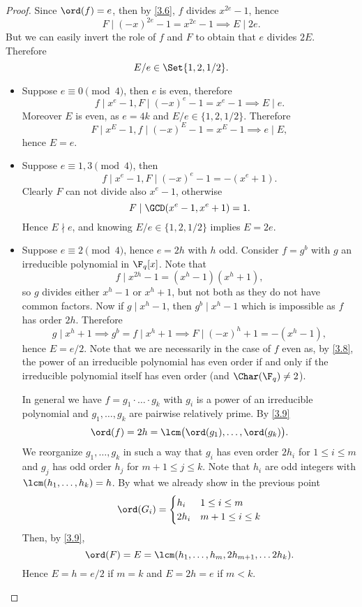 \begin{proof}
	Since \(\ord(f)=e\), then by \autoref{3.6}, \(f\) divides \(x^{2e}-1\), hence
	\[
		F \mid (-x)^{2e}-1 = x^{2e}-1 \implies E \mid 2e.
	\]
	But we can easily invert the role of \(f\) and \(F\) to obtain that \(e\) divides \(2E\). Therefore
	\[
		E/e \in \Set{1,2,1/2}.
	\]
	\begin{itemize}
		\item Suppose \(e \equiv 0 \pmod{4}\), then \(e\) is even, therefore
		      \[
			      f \mid x^e-1, F\mid (-x)^e-1 = x^e-1 \implies E \mid e.
		      \]
		      Moreover \(E\) is even, as \(e=4k\) and \(E/e \in \{1,2,1/2\}\). Therefore
		      \[
			      F \mid x^E-1, f \mid (-x)^E-1 = x^E-1 \implies e \mid E,
		      \]
		      hence \(E=e\).
		\item Suppose \(e \equiv 1,3 \pmod{4}\), then
		      \[
			      f \mid x^e-1, F \mid (-x)^e-1 = -(x^e+1).
		      \]
		      Clearly \(F\) can not divide also \(x^e-1\), otherwise
		      \[
			      F \mid \GCD(x^e-1,x^e+1) =1.
		      \]
		      Hence \(E \nmid e\), and knowing \(E/e \in \{1,2,1/2\}\) implies \(E=2e\).
		\item Suppose \(e \equiv 2 \pmod{4}\), hence \(e = 2h\) with \(h\) odd. Consider \(f=g^b\) with \(g\) an irreducible polynomial in \(\F_q[x]\). Note that
		      \[
			      f \mid x^{2h}-1 = (x^h-1)(x^h+1),
		      \]
		      so \(g\) divides either \(x^h-1\) or \(x^h+1\), but not both as they do not have common factors.
		      Now if \(g\mid x^h-1\), then \(g^b \mid x^h-1\) which is impossible as \(f\) has order \(2h\). Therefore
		      \[
			      g \mid x^h+1 \implies g^b=f \mid x^h+1 \implies F \mid (-x)^h +1 = -(x^h-1),
		      \]
		      hence \(E=e/2\). Note that we are necessarily in the case of \(f\) even as, by \autoref{3.8}, the power of an irreducible polynomial has even order if and only if the irreducible polynomial itself has even order (and \(\Char(\F_q)\neq 2\)).
		      
		      In general we have \(f = g_1 \cdot\ldots\cdot g_k\) with \(g_i\) is a power of an irreducible polynomial and \(g_1,\ldots,g_k\) are pairwise relatively prime. By \autoref{3.9}
		      \[
			      \ord(f) = 2h = \lcm\big(\ord(g_1),\ldots,\ord(g_k)\big).
		      \]
		      We reorganize \(g_1,\ldots,g_k\) in such a way that \(g_i\) has even order \(2 h_i\) for \(1\le i \le m\) and \(g_j\) has odd order \(h_j\) for \(m+1 \le j \le k\). Note that \(h_i\) are odd integers with \(\lcm(h_1,\ldots,h_k)=h\). By what we already show in the previous point
		      \[
			      \ord(G_i) =
			      \begin{cases}
				      h_i  & 1 \le i \le m    \\
				      2h_i & m+1 \le i \le k
			      \end{cases}
		      \]
		      Then, by \autoref{3.9},
		      \[
			      \ord(F) = E = \lcm(h_1,\ldots,h_m,2h_{m+1}, \ldots 2h_k).
		      \]
		      Hence \(E=h=e/2\) if \(m=k\) and \(E=2h=e\) if \(m<k\).\qedhere
	\end{itemize}
\end{proof}

